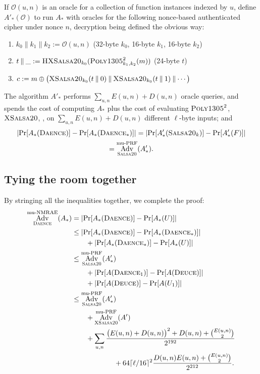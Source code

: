 \documentclass{article}
\def\operatorsc#1{{%
  \ifmmode\let\next=\operatorname\else\let\next=\relax\fi\next{\textsc{#1}}}}
\def\Salsa#1/{\operatorsc{Salsa#1}}
\def\XSalsa#1/{\operatorsc{XSalsa#1}}
\def\HXSalsa#1/{\operatorsc{HXSalsa#1}}
\def\Poly#1/{\operatorsc{Poly#1}}
\def\DAENCE/{\operatorsc{Daence}}
\def\DEUCE/{\operatorsc{Deuce}}
\def\muPRF{%
  \ifmmode\def\next{\operatorname{mu-PRF}}%
    \else\def\next/{mu-\textsc{prf}}%
  \fi\next}
\def\muNMRAE{%
  \ifmmode\def\next{\operatorname{mu-NMRAE}}%
    \else\def\next/{mu-\textsc{nmrae}}%
  \fi\next}
\DeclareMathOperator{\Adv}{Adv}
\newcommand{\concat}{\mathbin\|}
\begin{document}
If $\mathcal O(u,n)$ is an oracle for a collection of function
 instances indexed by $u$, define $A'_*(\mathcal O)$ to run $A_*$ with
 oracles for the following nonce-based authenticated cipher under
 nonce $n$, decryption being defined the obvious way:
%
\begin{enumerate}
  \item $k_0 \concat k_1 \concat k_2 := \mathcal O(u, n)$
    \hfill (32-byte $k_0$, 16-byte $k_1$, 16-byte $k_2$)
  \item $t \concat \_ := \HXSalsa20/_{k_0}(\Poly1305/^2_{k_1,k_2}(m))$
    \hfill (24-byte $t$)
  \item $c := m \oplus \bigl(\XSalsa20/_{k_0}(t \mathbin\| 0) \concat
      \XSalsa20/_{k_0}(t \mathbin\| 1) \concat \dotsb\bigr)$
\end{enumerate}
%
The algorithm $A'_*$ performs $\sum_{u,n} E(u,n) + D(u,n)$ oracle
 queries, and spends the cost of computing $A_*$ plus the cost of
 evaluating $\Poly1305/^2$, $\XSalsa20/$, \etc, on
 $\sum_{u,n} E(u,n) + D(u,n)$ different $\ell$-byte inputs; and
%
\begin{multline*}
  \lvert\Pr[A_*(\DAENCE/)] - \Pr[A_*(\DAENCE/_*)]\rvert
   = \lvert\Pr[A'_*(\Salsa20/_k)] - \Pr[A'_*(F)]\rvert \\
   = \Adv^{\muPRF}_{\Salsa20/}(A'_*).
\end{multline*}

\subsection{Tying the room together}

By stringing all the inequalities together, we complete the proof:
%
\begin{align*}
  \Adv^{\muNMRAE}_{\DAENCE/}(A_*)
  &= \lvert\Pr[A_*(\DAENCE/)] - \Pr[A_*(U)]\rvert \\
  &\leq \lvert\Pr[A_*(\DAENCE/)] - \Pr[A_*(\DAENCE/_*)]\rvert \\
  &\qquad + \lvert\Pr[A_*(\DAENCE/_*)] - \Pr[A_*(U)]\rvert \\
  &\leq \Adv^{\muPRF}_{\Salsa20/}(A'_*) \\
  &\qquad + \lvert\Pr[A(\DAENCE/_1)] - \Pr[A(\DEUCE/)]\rvert \\
  &\qquad + \lvert\Pr[A(\DEUCE/)] - \Pr[A(U_1)]\rvert \\
  &\leq \Adv^{\muPRF}_{\Salsa20/}(A'_*) \\
  &\qquad + \Adv^{\muPRF}_{\XSalsa20/}(A') \\
  &\qquad + \sum_{u,n}
              \frac{\bigl(E(u,n) + D(u,n)\bigr)^2 + D(u,n) + \binom{E(u,n)}{2}}
                   {2^{192}} \\
  &\qquad\qquad\qquad
          + 64\lceil\ell/16\rceil^2
            \frac{D(u,n) E(u,n) + \binom{E(u,n)}{2}}{2^{212}}.
\end{align*}

\end{document}
